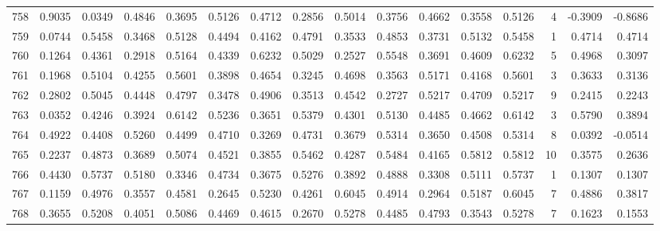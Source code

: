 \begin{tabular}{lrrrrrrrrrrrrrrr}
758 &      0.9035 &  0.0349 &  0.4846 &  0.3695 &  0.5126 &  0.4712 &  0.2856 &  0.5014 &  0.3756 &  0.4662 &   0.3558 &     0.5126 &      4 &                   -0.3909 &                    -0.8686 \\
759 &      0.0744 &  0.5458 &  0.3468 &  0.5128 &  0.4494 &  0.4162 &  0.4791 &  0.3533 &  0.4853 &  0.3731 &   0.5132 &     0.5458 &      1 &                    0.4714 &                     0.4714 \\
760 &      0.1264 &  0.4361 &  0.2918 &  0.5164 &  0.4339 &  0.6232 &  0.5029 &  0.2527 &  0.5548 &  0.3691 &   0.4609 &     0.6232 &      5 &                    0.4968 &                     0.3097 \\
761 &      0.1968 &  0.5104 &  0.4255 &  0.5601 &  0.3898 &  0.4654 &  0.3245 &  0.4698 &  0.3563 &  0.5171 &   0.4168 &     0.5601 &      3 &                    0.3633 &                     0.3136 \\
762 &      0.2802 &  0.5045 &  0.4448 &  0.4797 &  0.3478 &  0.4906 &  0.3513 &  0.4542 &  0.2727 &  0.5217 &   0.4709 &     0.5217 &      9 &                    0.2415 &                     0.2243 \\
763 &      0.0352 &  0.4246 &  0.3924 &  0.6142 &  0.5236 &  0.3651 &  0.5379 &  0.4301 &  0.5130 &  0.4485 &   0.4662 &     0.6142 &      3 &                    0.5790 &                     0.3894 \\
764 &      0.4922 &  0.4408 &  0.5260 &  0.4499 &  0.4710 &  0.3269 &  0.4731 &  0.3679 &  0.5314 &  0.3650 &   0.4508 &     0.5314 &      8 &                    0.0392 &                    -0.0514 \\
765 &      0.2237 &  0.4873 &  0.3689 &  0.5074 &  0.4521 &  0.3855 &  0.5462 &  0.4287 &  0.5484 &  0.4165 &   0.5812 &     0.5812 &     10 &                    0.3575 &                     0.2636 \\
766 &      0.4430 &  0.5737 &  0.5180 &  0.3346 &  0.4734 &  0.3675 &  0.5276 &  0.3892 &  0.4888 &  0.3308 &   0.5111 &     0.5737 &      1 &                    0.1307 &                     0.1307 \\
767 &      0.1159 &  0.4976 &  0.3557 &  0.4581 &  0.2645 &  0.5230 &  0.4261 &  0.6045 &  0.4914 &  0.2964 &   0.5187 &     0.6045 &      7 &                    0.4886 &                     0.3817 \\
768 &      0.3655 &  0.5208 &  0.4051 &  0.5086 &  0.4469 &  0.4615 &  0.2670 &  0.5278 &  0.4485 &  0.4793 &   0.3543 &     0.5278 &      7 &                    0.1623 &                     0.1553 \\

\end{tabular}
